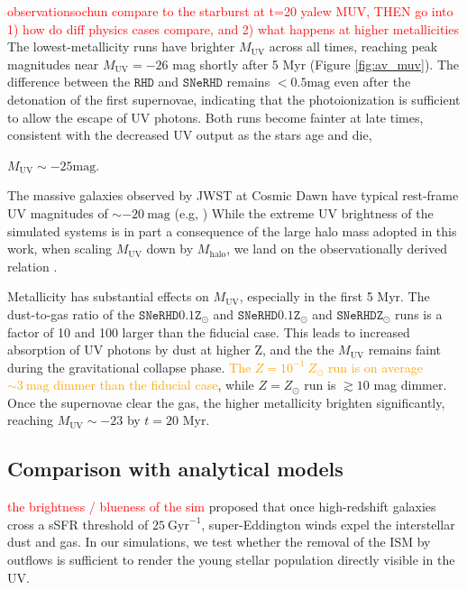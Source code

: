 \documentclass[twocolumn,linenumbers]{aastex631}
\begin{document}
\textcolor{red}{observationsochun compare to the starburst at t=20 yalew MUV, THEN go into 1) how do diff physics cases compare, and 2) what happens at higher metallicities} The lowest-metallicity runs have brighter $M_\mathrm{UV}$ across all times, reaching peak magnitudes near $M_\mathrm{UV} =-26$ mag shortly after 5 Myr (Figure \ref{fig:av_muv}). The difference between the $\mathtt{RHD}$ and $\mathtt{SNeRHD}$ remains $< 0.5 \mathrm{mag}$ even after the detonation of the first supernovae, indicating that the photoionization is sufficient to allow the escape of UV photons. Both runs become fainter at late times, consistent with the decreased UV output as the stars age and die, {$M_\mathrm{UV} \sim -25 \mathrm{mag}$. 

The massive galaxies observed by JWST at Cosmic Dawn have typical rest-frame UV magnitudes of $\sim -20\ \mathrm{mag}$ (e.g, \citealt{2024A&A...691A..87M})
While the extreme UV brightness of the simulated systems is in part a consequence of the large halo mass adopted in this work, when scaling $M_\mathrm{UV}$ down by $M_\mathrm{halo}$, we land on the observationally derived relation  \citep{2025MNRAS.543.3802Y,2025ApJ...985...80R}.

Metallicity has substantial effects on $M_\mathrm{UV}$, especially in the first 5 Myr. The dust-to-gas ratio of the $\mathtt{SNeRHD0.1Z}_\odot$ and $\mathtt{SNeRHD0.1Z}_\odot$ and $\mathtt{SNeRHDZ}_\odot$ runs is a factor of 10 and 100 larger than the fiducial case. This leads to increased absorption of UV photons by dust at higher Z, and the the $M_\mathrm{UV}$ remains faint during the gravitational collapse phase. \textcolor{orange}{The $Z = 10^{-1}\ Z_\odot$ run is on average $\sim 3\ \mathrm{mag}$ dimmer than the fiducial case}, while $Z = Z_\odot$ run is $\gtrsim 10$ mag dimmer. Once the supernovae clear the gas, the higher metallicity brighten significantly, reaching $M_\mathrm{UV} \sim -23 $ by $t=20$ Myr. \citep{2026A&A...705L..10M}

\subsection{Comparison with analytical models}
\textcolor{red}{the brightness / blueness of the sim}
\cite{2023MNRAS.522.3986F} proposed that once high-redshift galaxies cross a sSFR threshold of $25\ \mathrm{Gyr}^{-1}$, super-Eddington winds expel the interstellar dust and gas. In our simulations, we test whether the removal of the ISM by outflows is sufficient to render the young stellar population directly visible in the UV. 

}
\end{document}
